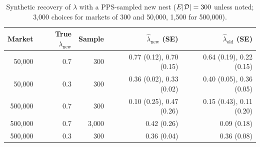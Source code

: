 \begin{table}[h]
\centering
\caption{Synthetic recovery of $\lambda$ with a PPS-sampled new nest ($E|\mathcal{D}| = 300$ unless noted; 3,000 choices for
markets of 300 and 50,000, 1,500 for 500,000).}
\label{tab:nestedcheck}
\small
\begin{tabular}{rrrrr}
\toprule
Market & True $\lambda_{\text{new}}$ & Sample & $\hat\lambda_{\text{new}}$ (SE) & $\hat\lambda_{\text{old}}$ (SE) \\
\midrule
50,000 & 0.7 & 300 & 0.77 (0.12), 0.70 (0.15) & 0.64 (0.19), 0.22 (0.15) \\
50,000 & 0.3 & 300 & 0.36 (0.02), 0.33 (0.02) & 0.40 (0.05), 0.36 (0.05) \\
500,000 & 0.7 & 300 & 0.10 (0.25), 0.47 (0.26) & 0.15 (0.43), 0.11 (0.20) \\
500,000 & 0.7 & 3,000 & 0.42 (0.26) & 0.09 (0.18) \\
500,000 & 0.3 & 300 & 0.36 (0.04) & 0.36 (0.08) \\
\bottomrule
\end{tabular}
\end{table}
